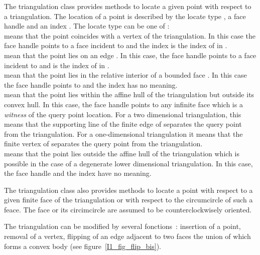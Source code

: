 The triangulation class    provides methods to locate
a given point with respect to a triangulation. The location of a point 
is described  by the locate type , a face handle  and
an index . The locate type can be one of
 : \\
 means that the point coincides with a vertex  of the triangulation.
 In this case the face handle  points to a face incident to 
and the index  is the index of   in .\\
 mean that the point lies on an edge . In this case, the face
handle 
points to a face incident to  and   is the
index of  in . \\
 mean that  the point lies in the relative interior of a bounded
face . In this case the face handle points to  and the
index 
has no meaning. \\
 mean that the point lies within the affine hull of
the triangulation but outside its convex hull. In this case, 
the face handle  points to any infinite face which is a {\em
witness } of the
query point location. For a two dimensional triangulation, this means
that the supporting line of the finite edge of   separates
the query point from the triangulation. For a one-dimensional
triangulation
it means that the 
finite vertex of   separates
the query point from the triangulation. \\
 means that  the point lies outside the
affine hull of the triangulation which is possible
in the case of a degenerate lower dimensional triangulation. In this 
case, the face
handle  and  the index  have no meaning.



The triangulation class also provides
methods to locate a point with respect to
a given  finite face of the triangulation or with respect to the
circumcircle of such a feace.
The face or its circimcircle are assumed to be counterclockwisely
oriented.



The triangulation can be modified by several fonctions~:
insertion of a point, removal of a vertex,
flipping of an edge adjacent to two faces the union of which forms
 a convex body (see figure~\ref{I1_fig_flip_bis}). 



